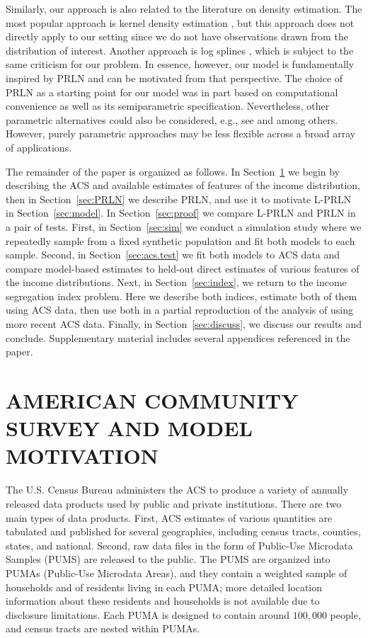 \documentclass[12pt]{article}
\begin{document}
Similarly, our approach is also related to the literature on density estimation. The most popular approach is kernel density estimation \citep[e.g.][]{scott2015multivariate}, but this approach does not directly apply to our setting since we do not have observations drawn from the distribution of interest. Another approach is log splines \citep{kooperberg1992logspline, stone1994use}, which is subject to the same criticism for our problem. In essence, however, our model is fundamentally inspired by PRLN and can be motivated from that perspective. The choice of PRLN as a starting point for our model was in part based on computational convenience as well as its semiparametric specification. Nevertheless, other parametric alternatives could also be considered, e.g., see \citet{singh1976function} and \citet{Dagum1977} among others. However, purely parametric approaches may be less flexible across a broad array of applications.

The remainder of the paper is organized as follows. In Section~\ref{sec:acs.model} we begin by describing the ACS and available estimates of features of the income distribution, then in Section~\ref{sec:PRLN} we describe PRLN, and use it to motivate L-PRLN in Section~\ref{sec:model}. In Section~\ref{sec:proof} we compare L-PRLN and PRLN in a pair of tests. First, in Section~\ref{sec:sim} we conduct a simulation study where we repeatedly sample from a fixed synthetic population and fit both models to each sample. Second, in Section~\ref{sec:acs.test} we fit both models to ACS data and compare model-based estimates to held-out direct estimates of various features of the income distributions. Next, in Section~\ref{sec:index}, we return to the income segregation index problem. Here we describe both indices, estimate both of them using ACS data, then use both in a partial reproduction of the analysis of \citet{reardon2011income} using more recent ACS data. Finally, in Section~\ref{sec:discuss}, we discuss our results and conclude. Supplementary material includes several appendices referenced in the paper.

\section{AMERICAN COMMUNITY SURVEY AND MODEL MOTIVATION}\label{sec:acs.model}
The U.S. Census Bureau administers the ACS to produce a variety of annually released data products used by public and private institutions. There are two main types of data products. First, ACS estimates of various quantities are tabulated and published for several geographies, including census tracts, counties, states, and national. Second, raw data files in the form of Public-Use Microdata Samples (PUMS) are released to the public. The PUMS are organized into PUMAs (Public-Use Microdata Areas), and they contain a weighted sample of households and of residents living in each PUMA; more detailed location information about these residents and households is not available due to disclosure limitations. Each PUMA is designed to contain around $100,000$ people, and census tracts are nested within PUMAs.
\end{document}
